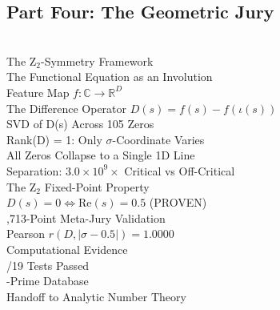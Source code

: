 \documentclass[11pt]{article}
\begin{document}
\vspace{12pt}
\subsection*{Part Four: The Geometric Jury}

\\
\quad The Z$_2$-Symmetry Framework\\
\quad \quad The Functional Equation as an Involution\\
\quad \quad Feature Map $f: \mathbb{C} \to \mathbb{R}^D$\\
\quad \quad The Difference Operator $D(s) = f(s) - f(\iota(s))$\\
\quad SVD of D(s) Across 105 Zeros\\
\quad \quad Rank(D) = 1: Only $\sigma$-Coordinate Varies\\
\quad \quad All Zeros Collapse to a Single 1D Line\\
\quad \quad Separation: $3.0 \times 10^9\times$ Critical vs Off-Critical\\
\quad The Z$_2$ Fixed-Point Property\\
\quad \quad $D(s) = 0 \iff \mathrm{Re}(s) = 0.5$ (PROVEN)\\
\quad {},713-Point Meta-Jury Validation\\
\quad \quad Pearson $r(D, |\sigma-0.5|) = 1.0000$\\
\quad Computational Evidence\\
\quad {}/19 Tests Passed\\
\quad {}-Prime Database\\
\quad Handoff to Analytic Number Theory\\
\end{document}
